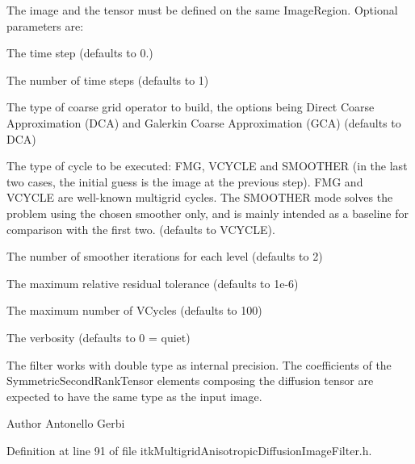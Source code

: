 The image and the tensor must be defined on the same Image\-Region. Optional parameters are\-:


\begin{DoxyEnumerate}
\item The time step (defaults to 0.)
\item The number of time steps (defaults to 1)
\item The type of coarse grid operator to build, the options being Direct Coarse Approximation (D\-C\-A) and Galerkin Coarse Approximation (G\-C\-A) (defaults to D\-C\-A)
\item The type of cycle to be executed\-: F\-M\-G, V\-C\-Y\-C\-L\-E and S\-M\-O\-O\-T\-H\-E\-R (in the last two cases, the initial guess is the image at the previous step). F\-M\-G and V\-C\-Y\-C\-L\-E are well-\/known multigrid cycles. The S\-M\-O\-O\-T\-H\-E\-R mode solves the problem using the chosen smoother only, and is mainly intended as a baseline for comparison with the first two. (defaults to V\-C\-Y\-C\-L\-E).
\item The number of smoother iterations for each level (defaults to 2)
\item The maximum relative residual tolerance (defaults to 1e-\/6)
\item The maximum number of V\-Cycles (defaults to 100)
\item The verbosity (defaults to 0 = quiet)
\end{DoxyEnumerate}

The filter works with double type as internal precision. The coefficients of the Symmetric\-Second\-Rank\-Tensor elements composing the diffusion tensor are expected to have the same type as the input image.

\begin{DoxyAuthor}{Author}
Antonello Gerbi 
\end{DoxyAuthor}


Definition at line 91 of file itk\-Multigrid\-Anisotropic\-Diffusion\-Image\-Filter.\-h.



